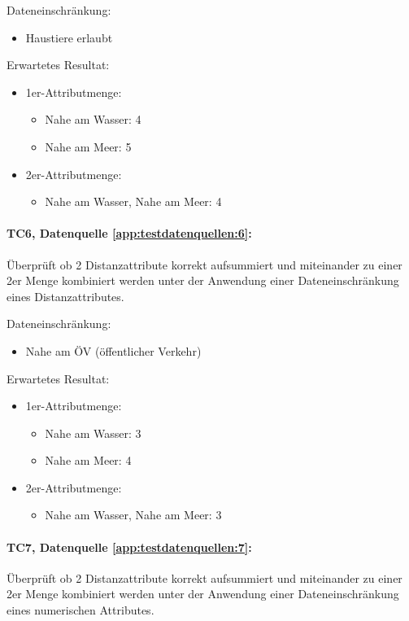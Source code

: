 Dateneinschränkung:
\begin{itemize}
	\item Haustiere erlaubt
\end{itemize}

Erwartetes Resultat:
\begin{itemize}
	\item 1er-Attributmenge:
	\begin{itemize}
		\item Nahe am Wasser: 4
		\item Nahe am Meer: 5
	\end{itemize}
	\item 2er-Attributmenge:
	\begin{itemize}
		\item Nahe am Wasser, Nahe am Meer: 4
	\end{itemize}
\end{itemize}

\paragraph{TC6, Datenquelle \cref{app:testdatenquellen:6}:} Überprüft ob 2 Distanzattribute korrekt aufsummiert und miteinander zu einer 2er Menge kombiniert werden unter der Anwendung einer Dateneinschränkung eines Distanzattributes. 

Dateneinschränkung:
\begin{itemize}
	\item Nahe am ÖV (öffentlicher Verkehr)
\end{itemize}

Erwartetes Resultat:
\begin{itemize}
	\item 1er-Attributmenge:
	\begin{itemize}
		\item Nahe am Wasser: 3
		\item Nahe am Meer: 4
	\end{itemize}
	\item 2er-Attributmenge:
	\begin{itemize}
		\item Nahe am Wasser, Nahe am Meer: 3
	\end{itemize}
\end{itemize}

\paragraph{TC7, Datenquelle \cref{app:testdatenquellen:7}:} Überprüft ob 2 Distanzattribute korrekt aufsummiert und miteinander zu einer 2er Menge kombiniert werden unter der Anwendung einer Dateneinschränkung eines numerischen Attributes. 

